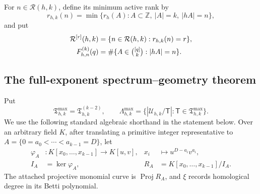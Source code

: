 \documentclass[11pt,reqno]{amsart}
\theoremstyle{definition}
\theoremstyle{remark}
\newcommand{\Rcal}{\mathcal R}
\begin{document}
For $n\in\Rcal(h,k)$, define its minimum active rank by
\[
 r_{h,k}(n)=\min\{r_h(A):A\subset\mathbb Z,\ |A|=k,\ |hA|=n\},
\]
and put
\[
 \begin{aligned}
 \Rcal^{[r]}(h,k)&=\{n\in\Rcal(h,k):r_{h,k}(n)=r\},\\
 F^{(k)}_{h,n}(q)&=
 \#\{A\in\tbinom{[q]}k:|hA|=n\}.
 \end{aligned}
\]

\subsection*{The full-exponent spectrum--geometry theorem}

Put
\[
 \mathfrak T^{\max}_{h,k}=\mathfrak T_{h,k}^{(k-2)},
 \qquad
 \Lambda^{\max}_{h,k}
 =\{ |\mathcal U_{h,k}/\mathsf T|:
       \mathsf T\in\mathfrak T^{\max}_{h,k}\}.
\]
We use the following standard algebraic shorthand in the statement below.
Over an arbitrary field $K$, after translating a primitive integer
representative to $A=\{0=a_0<\cdots<a_{k-1}=D\}$, let
\[
 \begin{aligned}
  \varphi_A&:K[x_0,\ldots,x_{k-1}]\longrightarrow K[u,v],
  &x_i&\longmapsto u^{D-a_i}v^{a_i},\\
  I_A&=\ker\varphi_A,
  &R_A&=K[x_0,\ldots,x_{k-1}]/I_A.
 \end{aligned}
\]
The attached projective monomial curve is $\operatorname{Proj}R_A$, and
$\xi$ records homological degree in its Betti polynomial.
\end{document}
